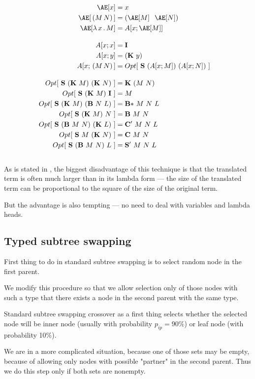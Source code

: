 \documentclass[12pt,a4paper]{report}
\begin{document}
\begin{align*}
\Ae[x]           &= x &\\
\Ae[\,(M\,N)\,]  &= (\Ae[M]\;\;\Ae[N]) &\\
\Ae[\lam{x}{M}]  &= A[ x ; \Ae[M] ] &
\\[1em]
A[x;x]           &= \Icomb &\\
A[x;y]           &= (\Kcomb~y)\\
A[x;\,(M\,N)\,]  &= Opt[~\Scomb~(A[x;M])~(A[x;N])~]
\\[1em]
Opt[~\Scomb~(\Kcomb~M)~(\Kcomb~N)~]   &= \Kcomb~(M~N)\\
Opt[~\Scomb~(\Kcomb~M)~\Icomb~]       &= M\\
Opt[~\Scomb~(\Kcomb~M)~(\Bcomb~N~L)~] &= \BBcomb~M~N~L\\
Opt[~\Scomb~(\Kcomb~M)~N~]            &= \Bcomb~M~N\\
Opt[~\Scomb~(\Bcomb~M~N)~(\Kcomb~L)~] &= \CCcomb~M~N~L\\
Opt[~\Scomb~M~(\Kcomb~N)~]            &= \Ccomb~M~N\\
Opt[~\Scomb~(\Bcomb~M~N)~L~]          &= \SScomb~M~N~L
\end{align*}
\\

As is stated in \cite{jones87},
the biggest disadvantage of this technique is that the translated
term is often much larger than in its lambda form --- the size of
the translated term can be proportional to the
square of the size of the original term. 

But the advantage is also tempting --- no need to deal with variables
and lambda heads.


\subsection{Typed subtree swapping}
\label{typed-swapping}

First thing to do in standard subtree swapping is to select random node
in the first parent. 

We modify this procedure so that we allow
selection only of those nodes with such a type that there exists  
a node in the second parent with the same type.

Standard subtree swapping crossover as a first thing selects 
whether the selected node will be inner node (usually with probability 
$p_{ip} = 90\%$) or leaf node (with probability 10\%).

We are in a more complicated situation, because one of those 
sets may be empty, because of allowing only nodes with possible "partner"
in the second parent. Thus we do this step only if both sets are
nonempty. 
\end{document}
